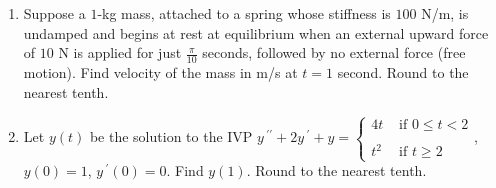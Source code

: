 \documentclass{ximera}
\begin{document}
\begin{enumerate}[label=(\arabic*)]


\item Suppose a $1$-kg mass, attached to a spring whose stiffness is $100$ N/m, is undamped and begins at rest at equilibrium when an external upward force of $10$ N is applied for just $\frac{\pi}{10}$ seconds, followed by no external force (free motion).  Find velocity of the mass in m/s at $t=1$ second.  Round to the nearest tenth.












    

\item Let $y(t)$ be the solution to the IVP $y\,^{\prime\prime}+2y\,^{\prime}+y=\left\{\begin{array}{lr}
       4t & \mbox{ if }0\leq t<2\\
       \\
       t^2 &  \mbox{ if }t\geq 2
     \end{array}\right.$, $y(0)=1$, $y\,^{\prime}(0)=0$.  Find $y(1)$.  Round to the nearest tenth.









\end{enumerate}
\end{document}
